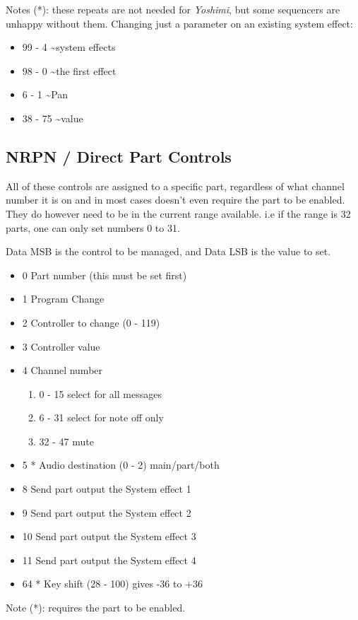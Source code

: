    Notes (*): these repeats are not needed for \textsl{Yoshimi},
   but some sequencers are unhappy without them.
   Changing just a parameter on an existing system effect:

   \begin{itemize}
      \item 99 -   4 \textasciitilde system effects
      \item 98 -   0 \textasciitilde the first effect
      \item 6 -   1 \textasciitilde Pan
      \item 38 -  75 \textasciitilde value
   \end{itemize}


\subsection{NRPN / Direct Part Controls}
\label{subsection:nrpns_direct_part_control}
   All of these controls are assigned to a specific part, regardless of what channel number it is on and in most cases doesn't even require the part to be enabled. They do however need to be in the current range available. i.e if the range is 32 parts, one can only set numbers 0 to 31.

   Data MSB is the control to be managed, and Data LSB is the value to set.

   \begin{itemize}
      \item 0 \hspace{8pt}Part number (this must be set first)
      \item 1 \hspace{8pt}Program Change
      \item 2 \hspace{8pt}Controller to change (0 - 119)
      \item 3 \hspace{8pt}Controller value
      \item 4 \hspace{8pt}Channel number
      \begin{enumerate}[label=\alph*)]
          \item 0 - 15 select for all messages
          \item 6 - 31 select for note off only
          \item 32 - 47 mute
      \end{enumerate}
      \item 5 * Audio destination (0 - 2) main/part/both
      \item 8 \hspace{8pt}Send part output the System effect 1
      \item 9 \hspace{8pt}Send part output the System effect 2
      \item 10 \hspace{8pt}Send part output the System effect 3
      \item 11 \hspace{8pt}Send part output the System effect 4
      \item 64 * Key shift (28 - 100) gives -36 to +36
   \end{itemize}
   Note (*): requires the part to be enabled.
